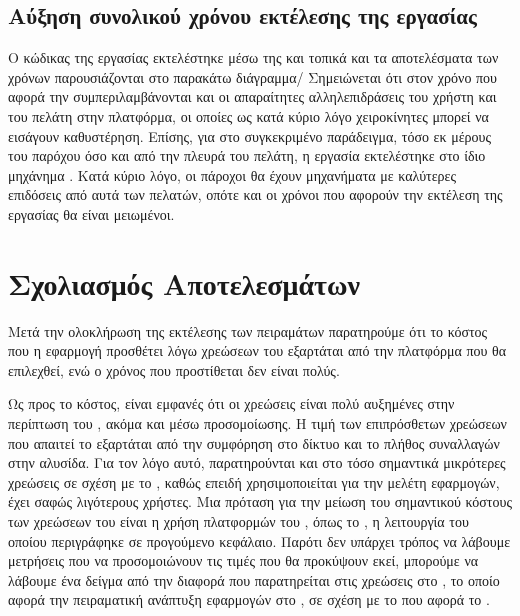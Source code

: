 \subsection{Αύξηση συνολικού χρόνου εκτέλεσης της εργασίας}
Ο κώδικας της εργασίας εκτελέστηκε μέσω της  και τοπικά και τα αποτελέσματα των χρόνων  παρουσιάζονται στο παρακάτω διάγραμμα/ Σημειώνεται ότι στον χρόνο που αφορά την  συμπεριλαμβάνονται και οι απαραίτητες αλληλεπιδράσεις του χρήστη και του πελάτη στην πλατφόρμα, οι οποίες ως κατά κύριο λόγο χειροκίνητες μπορεί να εισάγουν καθυστέρηση. Επίσης, για στο συγκεκριμένο παράδειγμα, τόσο εκ μέρους του παρόχου όσο και από την πλευρά του πελάτη, η εργασία εκτελέστηκε στο ίδιο μηχάνημα . Κατά κύριο λόγο, οι πάροχοι θα έχουν μηχανήματα με καλύτερες επιδόσεις από αυτά των πελατών, οπότε και οι χρόνοι που αφορούν την εκτέλεση της εργασίας θα είναι μειωμένοι. 


\begin{center}

    \end{center}

\section{Σχολιασμός Αποτελεσμάτων}
Μετά την ολοκλήρωση της εκτέλεσης των πειραμάτων παρατηρούμε ότι το κόστος που η εφαρμογή προσθέτει λόγω χρεώσεων του  εξαρτάται από την πλατφόρμα που θα επιλεχθεί, ενώ ο χρόνος που προστίθεται δεν είναι πολύς.

Ως προς το κόστος, είναι εμφανές ότι οι χρεώσεις είναι πολύ αυξημένες στην περίπτωση του , ακόμα και μέσω προσομοίωσης. Η τιμή των επιπρόσθετων χρεώσεων που απαιτεί το  εξαρτάται από την συμφόρηση στο δίκτυο και το πλήθος συναλλαγών στην αλυσίδα. Για τον λόγο αυτό, παρατηρούνται και στο  τόσο σημαντικά μικρότερες χρεώσεις σε σχέση με το , καθώς επειδή χρησιμοποιείται για την μελέτη εφαρμογών, έχει σαφώς λιγότερους χρήστες. Μια πρόταση για την μείωση του σημαντικού κόστους των χρεώσεων του  είναι η χρήση πλατφορμών του , όπως το , η λειτουργία του οποίου περιγράφηκε σε προγούμενο κεφάλαιο. Παρότι δεν υπάρχει τρόπος να λάβουμε μετρήσεις που να προσομοιώνουν τις τιμές που θα προκύψουν εκεί, μπορούμε να λάβουμε ένα δείγμα από την διαφορά που παρατηρείται στις χρεώσεις στο , το οποίο αφορά την πειραματική ανάπτυξη εφαρμογών στο , σε σχέση με το  που αφορά το .

